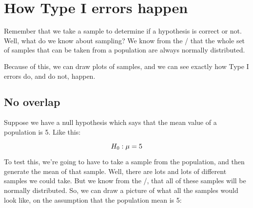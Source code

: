 \documentclass[../../../main.tex]{subfiles}
\begin{document}
\section{How Type I errors happen}

Remember that we take a sample to determine if a hypothesis is correct or not. Well, what do we know about sampling? We know from the \CLT/ that the whole set of samples that can be taken from a population are always normally distributed. 

Because of this, we can draw plots of samples, and we can see exactly how Type I errors do, and do not, happen.


\subsection{No overlap}

Suppose we have a null hypothesis which says that the mean value of a population is 5. Like this:

\begin{equation*}
  \NullHyp/: \populationmean = 5
\end{equation*}

\noindent
To test this, we're going to have to take a sample from the population, and then generate the mean of that sample. Well, there are lots and lots of different samples we could take. But we know from the \CLT/, that all of these samples will be normally distributed. So, we can draw a picture of what all the samples would look like, on the assumption that the population mean is 5:

\begin{center}
\end{center}
\end{document}
